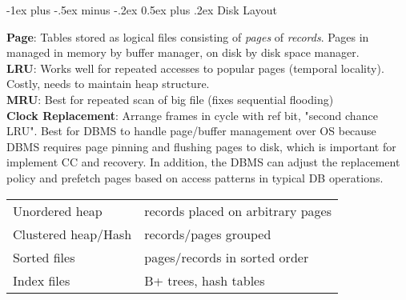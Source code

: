\documentclass[10pt,landscape]{article}
\makeatletter
\renewcommand{\section}{\@startsection{section}{1}{0mm}%
                                {-1ex plus -.5ex minus -.2ex}%
                                {0.5ex plus .2ex}%
                                {\normalfont\large\bfseries}}
\makeatother
\begin{document}
\begin{multicols}{3}
%
%
%
%


\section{Disk Layout}

\textbf{Page}: Tables stored as logical files consisting of \textit{pages} of \textit{records}. Pages in managed in memory by buffer manager, on disk by disk space manager. \\
\textbf{LRU}: Works well for repeated accesses to popular pages (temporal locality). Costly, needs to maintain heap structure. \\
\textbf{MRU}: Best for repeated scan of big file (fixes sequential flooding) \\
\textbf{Clock Replacement}: Arrange frames in cycle with ref bit, "second chance LRU". Best for DBMS to handle page/buffer management over OS because DBMS requires page pinning and flushing pages to disk, which is important for implement CC and recovery. In addition, the DBMS can adjust the replacement policy and prefetch pages based on access patterns in typical DB operations.

\begin{tabular}{@{}ll@{}}
Unordered heap      & records placed on arbitrary pages \\
Clustered heap/Hash & records/pages grouped \\
Sorted files        & pages/records in sorted order \\
Index files         & B+ trees, hash tables
\end{tabular}


\end{multicols}
\end{document}
